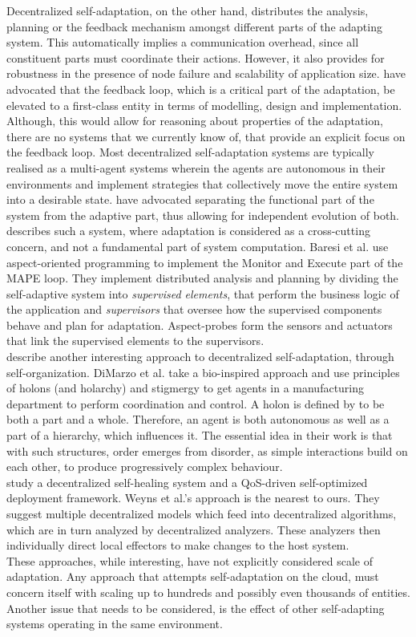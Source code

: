 \documentclass[10pt,journal,compsoc]{IEEEtran}
\begin{document}
Decentralized self-adaptation, on the other hand, distributes the analysis, planning or the feedback mechanism amongst different parts of the adapting system. This automatically implies a communication overhead, since all constituent parts must coordinate their actions. However, it also provides for robustness in the presence of node failure and scalability of application size. \cite{Cheng2009Softwarea} have advocated that the feedback loop, which is a critical part of the adaptation, be elevated to a first-class entity in terms of modelling, design and implementation. Although, this would allow for reasoning about properties of the adaptation, there are no systems that we currently know of, that provide an explicit focus on the feedback loop. Most decentralized self-adaptation systems are typically realised as a multi-agent systems wherein the agents are autonomous in their environments and implement strategies that collectively move the entire system into a desirable state. \cite{Cheng2005Making} have advocated separating the functional part of the system from the adaptive part, thus allowing for independent evolution of both. \cite{Baresi2008Towards} describes such a system, where adaptation is considered as a cross-cutting concern, and not a fundamental part of system computation. Baresi et al. use aspect-oriented programming to implement the Monitor and Execute part of the MAPE loop. They implement distributed analysis and planning by dividing the self-adaptive system into \textit{supervised elements}, that perform the business logic of the application and \textit{supervisors} that oversee how the supervised components behave and plan for adaptation. Aspect-probes form the sensors and actuators that link the supervised elements to the supervisors. \\
\cite{Di2005Self-organization} describe another interesting approach to decentralized self-adaptation, through self-organization. DiMarzo et al. take a bio-inspired approach and use principles of holons (and holarchy) and stigmergy to get agents in a manufacturing department to perform coordination and control. A holon is defined by \cite{Koestler1990Ghost} to be both a part and a whole. Therefore, an agent is both autonomous as well as a part of a hierarchy, which influences it. The essential idea in their work is that with such structures, order emerges from disorder, as simple interactions build on each other, to produce progressively complex behaviour.\\
\cite{Weyns2010decentralized} study a decentralized self-healing system and a QoS-driven self-optimized deployment framework. Weyns et al.'s approach is the nearest to ours. They suggest multiple decentralized models which feed into decentralized algorithms, which are in turn analyzed by decentralized analyzers. These analyzers then individually direct local effectors to make changes to the host system.\\
These approaches, while interesting, have not explicitly considered scale of adaptation. Any approach that attempts self-adaptation on the cloud, must concern itself with scaling up to hundreds and possibly even thousands of entities. Another issue that needs to be considered, is the effect of other self-adapting systems operating in the same environment. 
\end{document}
